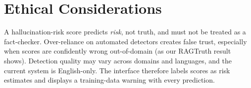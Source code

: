 \section{Ethical Considerations}

A hallucination-risk score predicts \emph{risk}, not truth, and must not be treated as a fact-checker. Over-reliance on automated detectors creates false trust, especially when scores are confidently wrong out-of-domain (as our RAGTruth result shows). Detection quality may vary across domains and languages, and the current system is English-only. The interface therefore labels scores as risk estimates and displays a training-data warning with every prediction.
